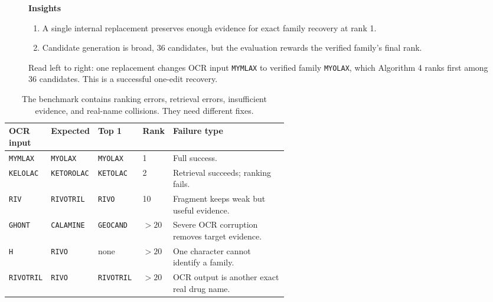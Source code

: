 \documentclass[11pt]{article}
\newcommand{\code}[1]{\texttt{#1}}
\newenvironment{figureinsights}{%
  \par\smallskip\begin{minipage}{0.94\linewidth}\small
  \textbf{Insights}\begin{enumerate}[leftmargin=1.5em,itemsep=1pt,topsep=2pt,parsep=0pt]
}{%
  \end{enumerate}\end{minipage}
}
\begin{document}
\begin{figure}[htbp]
\centering
{}
\caption{Read left to right: one replacement changes OCR input \code{MYMLAX}
to verified family \code{MYOLAX}, which Algorithm 4 ranks first among 36
candidates. This is a successful one-edit recovery.}
\label{fig:worked}
\begin{figureinsights}
  \item A single internal replacement preserves enough evidence for exact family recovery at rank 1.
  \item Candidate generation is broad, 36 candidates, but the evaluation rewards the verified family's final rank.
\end{figureinsights}
\end{figure}

\begin{table}[htbp]
\centering
\small
\begin{tabularx}{\linewidth}{@{}p{0.14\linewidth}p{0.15\linewidth}p{0.16\linewidth}p{0.10\linewidth}Y@{}}
\toprule
\textbf{OCR input} & \textbf{Expected} & \textbf{Top 1} & \textbf{Rank} & \textbf{Failure type} \\
\midrule
\code{MYMLAX} & \code{MYOLAX} & \code{MYOLAX} & 1 & Full success. \\
\code{KELOLAC} & \code{KETOROLAC} & \code{KETOLAC} & 2 & Retrieval succeeds; ranking fails. \\
\code{RIV} & \code{RIVOTRIL} & \code{RIVO} & 10 & Fragment keeps weak but useful evidence. \\
\code{GHONT} & \code{CALAMINE} & \code{GEOCAND} & $>20$ & Severe OCR corruption removes target evidence. \\
\code{H} & \code{RIVO} & none & $>20$ & One character cannot identify a family. \\
\code{RIVOTRIL} & \code{RIVO} & \code{RIVOTRIL} & $>20$ & OCR output is another exact real drug name. \\
\bottomrule
\end{tabularx}
\caption{The benchmark contains ranking errors, retrieval errors, insufficient
evidence, and real-name collisions. They need different fixes.}
\label{tab:examples}
\end{table}
\end{document}
